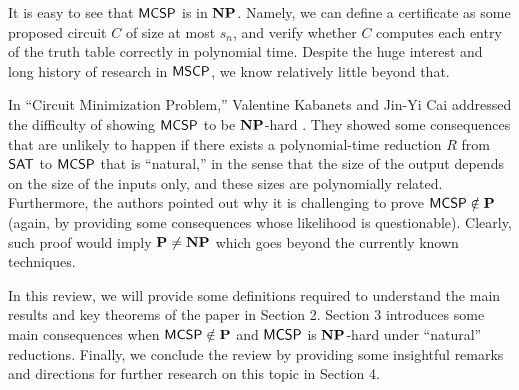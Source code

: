 \documentclass[11pt]{article}
\begin{document}
\bigskip

It is easy to see that $\mathsf{MCSP}$ is in $\mathbf{NP}$. Namely, we can define a certificate as some proposed circuit $C$ of size at most $s_n$, and verify whether $C$ computes each entry of the truth table correctly in polynomial time.
%
Despite the huge interest and long history of research in $\mathsf{MSCP}$,
we know relatively little beyond that.

In ``Circuit Minimization Problem,'' Valentine Kabanets and Jin-Yi Cai addressed the difficulty of showing $\mathsf{MCSP}$ to be $\mathbf{NP}$-hard \cite{10.1145/335305.335314}. They showed some consequences that are unlikely to happen if there exists a polynomial-time reduction $R$ from $\mathsf{SAT}$ to $\mathsf{MCSP}$ that is ``natural,'' in the sense that the size of the output depends on the size of the inputs only, and these sizes are polynomially related.  Furthermore, the authors pointed out why it is challenging to prove $\mathsf{MCSP} \notin \mathbf{P}$ (again, by providing some consequences whose likelihood is questionable). Clearly, such proof would imply $\mathbf{P} \neq \mathbf{NP}$ which goes beyond the currently known techniques. 

In this review, we will provide some definitions required to understand the main results and key theorems of the paper in Section 2. Section 3 introduces some main consequences when $\mathsf{MCSP} \notin \mathbf{P}$ and $\mathsf{MCSP}$ is $\mathbf{NP}$-hard under ``natural'' reductions. Finally, we conclude the review by providing some insightful remarks and directions for further research on this topic in Section 4.


%



\end{document}

